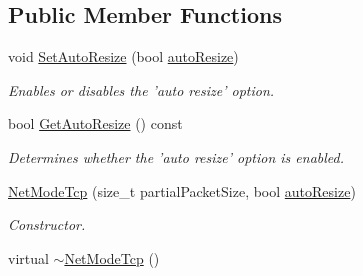 \subsection*{Public Member Functions}
\begin{DoxyCompactItemize}
\item 
void \hyperlink{class_net_mode_tcp_a77b6d0cebbfd21778087927dd02a14ee}{SetAutoResize} (bool \hyperlink{class_net_mode_tcp_ae1bb51196acb2d71e38ce60b0860a1fc}{autoResize})
\begin{DoxyCompactList}\small\item\em Enables or disables the 'auto resize' option. \item\end{DoxyCompactList}\item 
bool \hyperlink{class_net_mode_tcp_abb7a8c9d33dcee5ecc7e069ddc81b6a2}{GetAutoResize} () const 
\begin{DoxyCompactList}\small\item\em Determines whether the 'auto resize' option is enabled. \item\end{DoxyCompactList}\item 
\hyperlink{class_net_mode_tcp_a4415c7fc6d6e7055166ca4ec0cd8182f}{NetModeTcp} (size\_\-t partialPacketSize, bool \hyperlink{class_net_mode_tcp_ae1bb51196acb2d71e38ce60b0860a1fc}{autoResize})
\begin{DoxyCompactList}\small\item\em Constructor. \item\end{DoxyCompactList}\item 
\hypertarget{class_net_mode_tcp_a7add8e97377b54708eb033fbd0abfde4}{
virtual \hyperlink{class_net_mode_tcp_a7add8e97377b54708eb033fbd0abfde4}{$\sim$NetModeTcp} ()}
\label{class_net_mode_tcp_a7add8e97377b54708eb033fbd0abfde4}


\end{DoxyCompactItemize}
